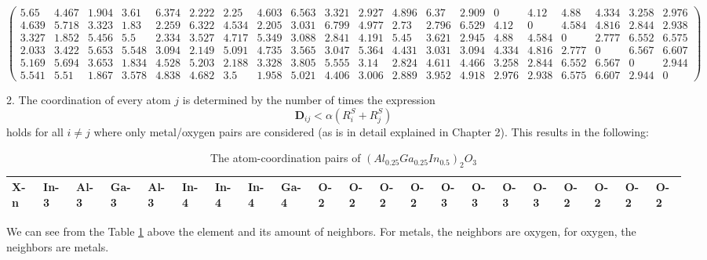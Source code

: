 \documentclass[11pt,oneside,czech,american]{book} %
\theoremstyle{definition} %
\theoremstyle{definition}
\begin{document}
$$\begin{pmatrix}
	5.65 & 4.467 & 1.904 & 3.61 & 6.374 & 2.222 & 2.25 & 4.603 & 6.563 & 3.321 & 2.927 & 4.896 & 6.37 & 2.909 & 0 & 4.12 & 4.88 & 4.334 & 3.258 & 2.976\\
	4.639 & 5.718 & 3.323 & 1.83 & 2.259 & 6.322 & 4.534 & 2.205 & 3.031 & 6.799 & 4.977 & 2.73 & 2.796 & 6.529 & 4.12 & 0 & 4.584 & 4.816 & 2.844 & 2.938\\
	3.327 & 1.852 & 5.456 & 5.5 & 2.334 & 3.527 & 4.717 & 5.349 & 3.088 & 2.841 & 4.191 & 5.45 & 3.621 & 2.945 & 4.88 & 4.584 & 0 & 2.777 & 6.552 & 6.575\\
	2.033 & 3.422 & 5.653 & 5.548 & 3.094 & 2.149 & 5.091 & 4.735 & 3.565 & 3.047 & 5.364 & 4.431 & 3.031 & 3.094 & 4.334 & 4.816 & 2.777 & 0 & 6.567 & 6.607\\
	5.169 & 5.694 & 3.653 & 1.834 & 4.528 & 5.203 & 2.188 & 3.328 & 3.805 & 5.555 & 3.14 & 2.824 & 4.611 & 4.466 & 3.258 & 2.844 & 6.552 & 6.567 & 0 & 2.944\\
	5.541 & 5.51 & 1.867 & 3.578 & 4.838 & 4.682 & 3.5 & 1.958 & 5.021 & 4.406 & 3.006 & 2.889 & 3.952 & 4.918 & 2.976 & 2.938 & 6.575 & 6.607 & 2.944 & 0
\end{pmatrix}$$
\normalsize

2. The coordination of every atom $j$ is determined by the number of times the expression $$\bm{D}_{ij} < \alpha(R^S_i + R^S_j)$$ holds for all $i \neq j$ where only metal/oxygen pairs are considered (as is in detail explained in Chapter 2). This results in the following:
\begin{table}[H]
	\tiny
	\centering
	\begin{tabular}{l|llllllllllllllllllll}
		\hline
		X-n & In-3  &Al-3  &	Ga-3 & Al-3 & In-4  & In-4  & In-4  & Ga-4  & O-2  & O-2  & O-2 & O-2 & O-3 & O-3 & O-3 & O-3 & O-2 & O-2  & O-2 & O-2   \\
		\hline
	\end{tabular}
	\caption{The atom-coordination pairs of $(Al_{0.25}Ga_{0.25}In_{0.5})_2 O_3$}
	\label{atom_coordinations}
\end{table}
We can see from the Table \ref{atom_coordinations} above the element and its amount of neighbors. For metals, the neighbors are oxygen, for oxygen, the neighbors are metals.
\end{document}
